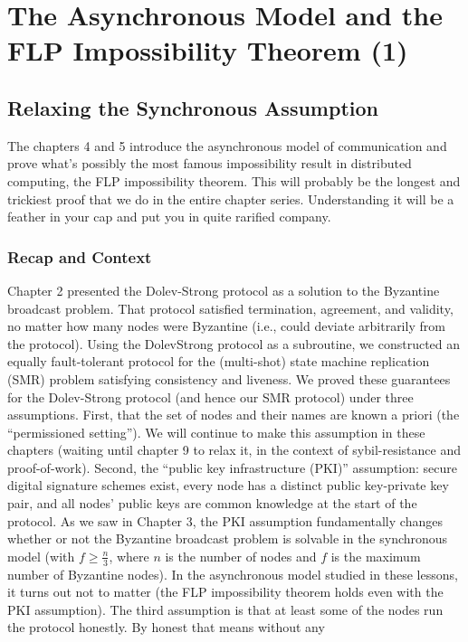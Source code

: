 \chapter{The Asynchronous Model and the FLP Impossibility Theorem (1)}
\section{Relaxing the Synchronous Assumption}
The chapters 4 and 5 introduce the asynchronous model of communication and prove what’s possibly the most famous impossibility result in distributed computing, the FLP impossibility
theorem. This will probably be the longest and trickiest proof that we do in the entire chapter
series. Understanding it will be a feather in your cap and put you in quite rarified company.


\subsection{Recap and Context}
Chapter 2 presented the Dolev-Strong protocol as a solution to the Byzantine broadcast
problem. That protocol satisfied termination, agreement, and validity, no matter how many
nodes were Byzantine (i.e., could deviate arbitrarily from the protocol). Using the DolevStrong protocol as a subroutine,
we constructed an equally fault-tolerant protocol for the (multi-shot) state machine replication (SMR) problem satisfying consistency and liveness.
We proved these guarantees for the Dolev-Strong protocol (and hence our SMR protocol)
under three assumptions. First, that the set of nodes and their names are known a priori
(the “permissioned setting”). We will continue to make this assumption in these chapters
(waiting until chapter 9 to relax it, in the context of sybil-resistance and proof-of-work).
Second, the “public key infrastructure (PKI)” assumption: secure digital signature schemes
exist, every node has a distinct public key-private key pair, and all nodes’ public keys are
common knowledge at the start of the protocol. As we saw in Chapter 3, the PKI assumption
fundamentally changes whether or not the Byzantine broadcast problem is solvable in the
synchronous model (with $f \geq \frac{n}{3}$, where $n$ is the number of nodes and $f$ is the maximum
number of Byzantine nodes). In the asynchronous model studied in these lessons, it turns
out not to matter (the FLP impossibility theorem holds even with the PKI assumption).
The third assumption is  that at least some
of the nodes run the protocol honestly.
By honest that means without any
